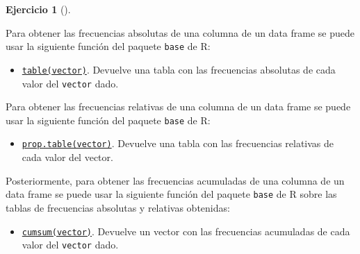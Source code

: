 \documentclass[
  a4paper,
]{scrreport}
\newenvironment{Shaded}{\begin{snugshade}}{\end{snugshade}}
\newcommand{\CommentTok}[1]{\textcolor[rgb]{0.37,0.37,0.37}{#1}}
\newcommand{\FunctionTok}[1]{\textcolor[rgb]{0.28,0.35,0.67}{#1}}
\newcommand{\NormalTok}[1]{\textcolor[rgb]{0.00,0.23,0.31}{#1}}
\newcommand{\OtherTok}[1]{\textcolor[rgb]{0.00,0.23,0.31}{#1}}
\newcommand{\SpecialCharTok}[1]{\textcolor[rgb]{0.37,0.37,0.37}{#1}}
\providecommand{\tightlist}{%
  \setlength{\itemsep}{0pt}\setlength{\parskip}{0pt}}\usepackage{longtable,booktabs,array}
\theoremstyle{definition}
\newtheorem{exercise}{Ejercicio}[chapter]
\theoremstyle{remark}
\begin{document}
\begin{exercise}[]
\begin{enumerate}
\begin{tcolorbox}
  Para obtener las frecuencias absolutas de una columna de un data frame
  se puede usar la siguiente función del paquete \texttt{base} de R:

  \begin{itemize}
  \tightlist
  \item
    \href{https://www.rdocumentation.org/packages/base/versions/3.6.2/topics/table}{\texttt{table(vector)}}.
    Devuelve una tabla con las frecuencias absolutas de cada valor del
    \texttt{vector} dado.
  \end{itemize}

  Para obtener las frecuencias relativas de una columna de un data frame
  se puede usar la siguiente función del paquete \texttt{base} de R:

  \begin{itemize}
  \tightlist
  \item
    \href{https://www.rdocumentation.org/packages/base/versions/3.6.2/topics/prop.table}{\texttt{prop.table(vector)}}.
    Devuelve una tabla con las frecuencias relativas de cada valor del
    vector.
  \end{itemize}

  Posteriormente, para obtener las frecuencias acumuladas de una columna
  de un data frame se puede usar la siguiente función del paquete
  \texttt{base} de R sobre las tablas de frecuencias absolutas y
  relativas obtenidas:

  \begin{itemize}
  \tightlist
  \item
    \href{https://www.rdocumentation.org/packages/base/versions/3.6.2/topics/cumsum}{\texttt{cumsum(vector)}}.
    Devuelve un vector con las frecuencias acumuladas de cada valor del
    \texttt{vector} dado.
  \end{itemize}

\begin{Shaded}
\end{Shaded}


\end{tcolorbox}
\end{enumerate}
\end{exercise}
\end{document}
